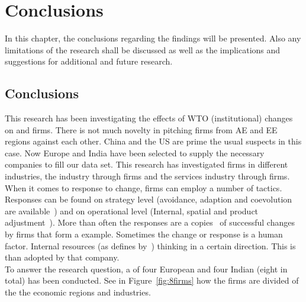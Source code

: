 \chapter{Conclusions}
In this chapter, the conclusions regarding the findings will be presented.
Also any limitations of the research shall be discussed as well as the implications and suggestions for additional and future research.

\section{Conclusions}
This research has been investigating the effects of WTO (institutional) \rr changes on  and  firms.
There is not much novelty in pitching firms from AE and EE regions against each other.
China and the US are prime the usual suspects in this case.
Now Europe and India have been selected to supply the necessary companies to fill our data set.
This research has investigated firms in different industries, the \manu industry through \pharma firms and the services industry through \its firms.\\
When it comes to response to change, firms can employ a number of tactics.
Responses can be found on strategy level (avoidance, adaption and coevolution are available~\citep{Cantwell:2009hg}) and on operational level (Internal, spatial and product adjustment~\citep{Lawton:2009vw,Hoekman:2004wa}).
More than often the responses are a copies~\citep{Scott:2008,DiMaggio:1983wt} of successful changes by firms that form a example.
Sometimes the change or response is a human factor.
Internal resources (as defines by~\cite{Barney:1991ur}) thinking in a certain direction.
This is than adopted by that company.\\
To answer the research question, a \mcs of four European and four Indian (eight in total) has been conducted.
See in Figure~\ref{fig:8firms} how the firms are divided of the the economic regions and industries.

